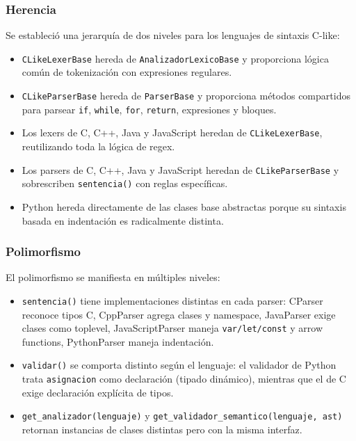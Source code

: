 \documentclass[12pt,a4paper]{article}
\begin{document}
\subsubsection{Herencia}

Se estableció una jerarquía de dos niveles para los lenguajes de sintaxis C-like:

\begin{itemize}
    \item \texttt{CLikeLexerBase} hereda de \texttt{AnalizadorLexicoBase} y proporciona lógica común de tokenización con expresiones regulares.
    \item \texttt{CLikeParserBase} hereda de \texttt{ParserBase} y proporciona métodos compartidos para parsear \texttt{if}, \texttt{while}, \texttt{for}, \texttt{return}, expresiones y bloques.
    \item Los lexers de C, C++, Java y JavaScript heredan de \texttt{CLikeLexerBase}, reutilizando toda la lógica de regex.
    \item Los parsers de C, C++, Java y JavaScript heredan de \texttt{CLikeParserBase} y sobrescriben \texttt{sentencia()} con reglas específicas.
    \item Python hereda directamente de las clases base abstractas porque su sintaxis basada en indentación es radicalmente distinta.
\end{itemize}

\subsubsection{Polimorfismo}

El polimorfismo se manifiesta en múltiples niveles:

\begin{itemize}
    \item \texttt{sentencia()} tiene implementaciones distintas en cada parser: CParser reconoce tipos C, CppParser agrega clases y namespace, JavaParser exige clases como toplevel, JavaScriptParser maneja \texttt{var/let/const} y arrow functions, PythonParser maneja indentación.
    \item \texttt{validar()} se comporta distinto según el lenguaje: el validador de Python trata \texttt{asignacion} como declaración (tipado dinámico), mientras que el de C exige declaración explícita de tipos.
    \item \texttt{get\_analizador(lenguaje)} y \texttt{get\_validador\_semantico(lenguaje, ast)} retornan instancias de clases distintas pero con la misma interfaz.
\end{itemize}
\end{document}
